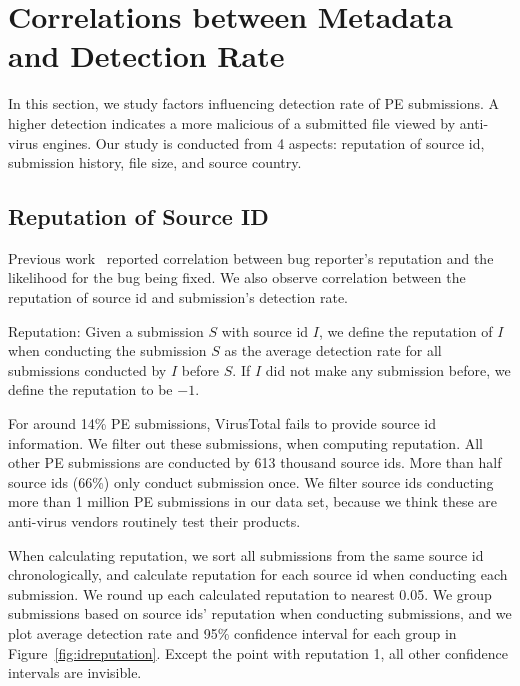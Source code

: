 \section{Correlations between Metadata and Detection Rate}
\label{sec:corr}
In this section, we study factors influencing detection rate of PE submissions.
A higher detection indicates a more malicious of a submitted file viewed by anti-virus engines.  
Our study is conducted from 4 aspects: reputation of source id, submission history, 
file size, and source country.



\subsection{Reputation of Source ID}

\label{sec:reputation}

Previous work~\cite{GuoICSE2010} reported correlation between bug reporter’s reputation and the likelihood for the bug being fixed. 
We also observe correlation between the reputation of source id and submission’s detection rate. 

\begin{definition}{Reputation:}
Given a submission $S$ with source id $I$, 
we define the reputation of $I$ when conducting the submission $S$ as the average detection rate for all submissions conducted by $I$ before $S$. 
If $I$ did not make any submission before, we define the reputation to be $-1$. 
\end{definition}

For around 14\% PE submissions, VirusTotal fails to provide source id information. 
We filter out these submissions, when computing reputation.
All other PE submissions are conducted by 613 thousand source ids. 
More than half source ids (66\%) only conduct submission once. 
We filter source ids conducting more than 1 million PE submissions in our data set, 
because we think these are anti-virus vendors routinely test their products. 

When calculating reputation, we sort all submissions from the same source id chronologically, 
and calculate reputation for each source id when conducting each submission. 
We round up each calculated reputation to nearest 0.05. 
We group submissions based on source ids' reputation when conducting submissions, 
and we plot average detection rate and 95\% confidence interval for each group in Figure~\ref{fig:idreputation}. 
Except the point with reputation 1, all other confidence intervals are invisible.  


